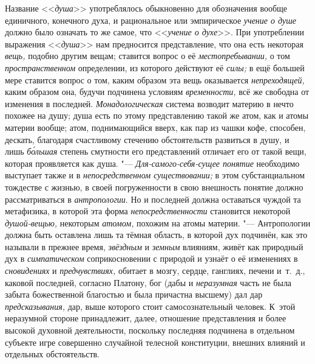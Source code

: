 Название <<{\em душа}>>
употреблялось обыкновенно для обозначения
вообще единичного, конечного духа, и рациональное или эмпирическое
{\em учение о душе}
должно было означать то же самое, что
<<{\em учение о духе}>>.
При употреблении выражения
<<{\em душа}>> нам
предносится представление, что она есть некоторая
{\em вещь,} подобно
другим вещам; ставится вопрос о её
{\em местопребывании,} о
том {\em пространственном}
определении, из которого действуют её
{\em силы;} в ещё большей
мере ставится вопрос о том, каким образом эта вещь оказывается
{\em непреходящей,} каким
образом она, будучи подчинена условиям
{\em временности,} всё же
свободна от изменения в последней.
{\em Монадологическая}
система возводит материю в нечто похожее на душу; душа есть
по этому представлению такой же атом, как и атомы материи вообще; атом,
поднимающийся вверх, как пар из чашки кофе, способен, дескать, благодаря
счастливому стечению обстоятельств развиться в душу, и лишь
{\em б\'{о}льшая} степень
смутности его представлений отличает его от такой вещи, которая проявляется
как душа. "--- {\em Для-самого-себя-сущее
понятие} необходимо выступает также и в
{\em непосредственном существовании;}
в этом субстанциальном тождестве с жизнью, в своей
погруженности в свою внешность понятие должно рассматриваться в
{\em антропологии}. Но и
последней должна оставаться чуждой та метафизика, в которой эта форма
{\em непосредственности}
становится некоторой
{\em душой-вещью,}
некоторым {\em атомом,}
похожим на атомы материи. "--- Антропологии
должна быть оставлена лишь та тёмная область, в которой дух подчинён, как
это называли в прежнее время,
{\em звёздным} и
{\em земным} влияниям,
живёт как природный дух в
{\em симпатическом}
соприкосновении с природой и узнаёт о её изменениях в
{\em сновидениях} и
{\em предчувствиях,}
обитает в мозгу, сердце, ганглиях, печени и~т.~д., каковой
последней, согласно Платону, бог (дабы и
{\em неразумная} часть не
была забыта божественной благостью и была причастна высшему) дал дар
{\em предсказывания,}
дар, выше которого стоит самосознательный человек. К~этой
неразумной стороне принадлежит, далее, отношение
представления и более высокой духовной деятельности, поскольку последняя
подчинена в отдельном субъекте игре совершенно случайной телесной
конституции, внешних влияний и отдельных обстоятельств.

